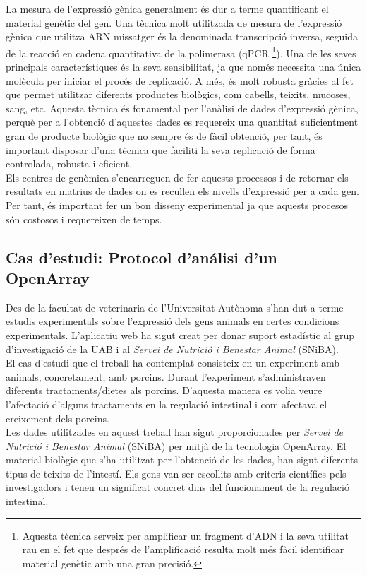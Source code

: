 \documentclass[english]{article}
\begin{document}
La mesura de l'expressió gènica generalment és dur a terme quantificant el material genètic del gen. Una tècnica molt utilitzada de mesura de l'expressió gènica que utilitza ARN missatger és la denominada transcripció inversa, seguida de la reacció en cadena quantitativa de la polimerasa (qPCR \footnote{Aquesta tècnica serveix per amplificar un fragment d'ADN i la seva utilitat rau en el fet que després de l'amplificació resulta molt més fàcil identificar material genètic amb una gran precisió.}). Una de les seves principals característiques és la seva sensibilitat, ja que només necessita una única molècula per iniciar el procés de replicació. A més, és molt robusta gràcies al fet que permet utilitzar diferents productes biològics, com cabells, teixits, mucoses, sang, etc. Aquesta tècnica és fonamental per l'anàlisi de dades d'expressió gènica, perquè per a l'obtenció d'aquestes dades es requereix una quantitat suficientment gran de producte biològic que no sempre és de fàcil obtenció, per tant, és important disposar d'una tècnica que faciliti la seva replicació de forma controlada, robusta i eficient.
\\

Els centres de genòmica s'encarreguen de fer aquests processos i de retornar els resultats en matrius de dades on es recullen els nivells d'expressió per a cada gen. Per tant, és important fer un bon disseny experimental ja que aquests procesos són costosos i requereixen de temps.


\subsection{Cas d'estudi: Protocol d'análisi d'un OpenArray}
Des de la facultat de veterinaria de l'Universitat Autònoma s'han dut a terme estudis experimentals sobre l'expressió dels gens animals en certes condicions experimentals. L'aplicatiu web ha sigut creat per donar suport estadístic al grup d'investigació de la UAB i al \textit{Servei de Nutrició i Benestar Animal} (SNiBA).
\\

El cas d'estudi que el treball ha contemplat consisteix en un experiment amb animals, concretament, amb porcins. Durant l'experiment s'administraven diferents tractaments/dietes als porcins. D'aquesta manera es volia veure l'afectació d'alguns tractaments en la regulació intestinal i com afectava el creixement dels porcins.
\\

Les dades utilitzades en aquest treball han sigut proporcionades per \textit{Servei de Nutrició i Benestar Animal} (SNiBA) per mitjà de la tecnologia OpenArray. El material biològic que s'ha utilitzat per l'obtenció de les dades, han sigut diferents tipus de teixits de l'intestí. Els gens van ser escollits amb criteris científics pels investigadors i tenen un significat concret dins del funcionament de la regulació intestinal.
\\
\end{document}
